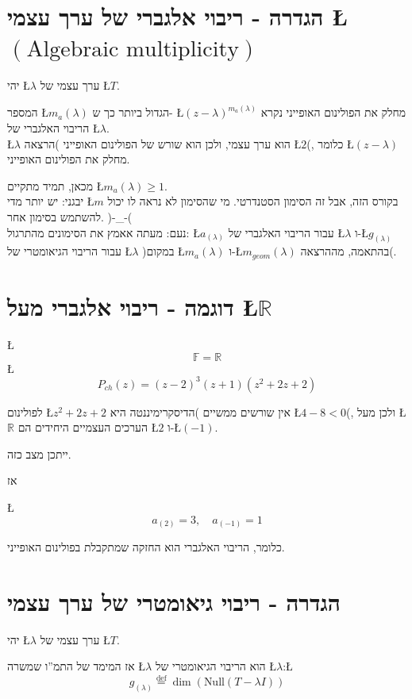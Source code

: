 \documentclass[english,hebrew]{article}
\begin{document}
\section{הגדרה - ריבוי אלגברי של ערך עצמי \L{$(\text{Algebraic multiplicity})$}}

יהי \L{$\lambda$} ערך עצמי של \L{$T$}.

המספר \L{$m_{a}(\lambda)$} הגדול ביותר כך ש- \L{$(z-\lambda)^{m_{a}(\lambda)}$}
מחלק את הפולינום האופייני נקרא הריבוי האלגברי של \L{$\lambda$}.\\

\L{$\lambda$} הוא ערך עצמי, ולכן הוא שורש של הפולינום האופייני )הרצאה
\L{$2$}(, כלומר \L{$(z-\lambda)$} מחלק את הפולינום האופייני.

מכאן, תמיד מתקיים \L{$m_{a}(\lambda)\geq1$}.\\

יבגני: יש יותר מדי \L{$m$} בקורס הזה, אבל זה הסימון הסטנדרטי. מי
שהסימון לא נראה לו יכול להשתמש בסימון אחר. )-\_-(\\

נעם: מעתה אאמץ את הסימונים מהתרגול: \L{$a_{\left(\lambda\right)}$}
עבור הריבוי האלגברי של \L{$\lambda$} ו-\L{$g_{\left(\lambda\right)}$}
עבור הריבוי הגיאומטרי של \L{$\lambda$} )במקום \L{$m_{a}(\lambda)$}
ו-\L{$m_{geom}(\lambda)$} בהתאמה, מההרצאה(.

\section{דוגמה - ריבוי אלגברי מעל \L{$\mathbb{R}$}}

\L{%
\[
\mathbb{F}=\mathbb{R}
\]
}%
\L{%
\[
P_{ch}(z)=(z-2)^{3}(z+1)(z^{2}+2z+2)
\]
}%

לפולינום \L{$z^{2}+2z+2$} אין שורשים ממשיים )הדיסקרימיננטה היא \L{$4-8<0$}(,
ולכן מעל \L{$\mathbb{R}$} הערכים העצמיים היחידים הם \L{$2$} ו-\L{$\left(-1\right)$}.

ייתכן מצב כזה.

אז

\L{%
\[
a_{\left(2\right)}=3,\quad a_{\left(-1\right)}=1
\]
}%

כלומר, הריבוי האלגברי הוא החזקה שמתקבלת בפולינום האופייני.

\section{הגדרה - ריבוי גיאומטרי של ערך עצמי}

יהי \L{$\lambda$} ערך עצמי של \L{$T$}.

אז המימד של התמ\textquotedblright ו שמשרה \L{$\lambda$} הוא הריבוי
הגיאומטרי של \L{$\lambda$}:\L{%
\[
g_{\left(\lambda\right)}\overset{\text{def}}{=}\dim\left(\text{Null}(T-\lambda I)\right)
\]
}%
\end{document}
